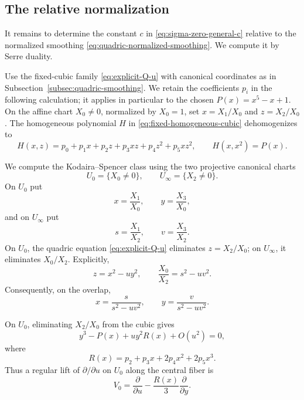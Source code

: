 \documentclass[10pt,a4paper]{amsart}
\begin{document}
\subsection{The relative normalization}
\label{subsec:relative-normalization}

It remains to determine the constant $c$ in
{\eqref{eq:sigma-zero-general-c}} relative to the normalized smoothing
\eqref{eq:quadric-normalized-smoothing}. We compute it by Serre duality.

\begingroup
Use the fixed-cubic family \eqref{eq:explicit-Q-u} with canonical
coordinates as in Subsection~\ref{subsec:quadric-smoothing}. We retain
the coefficients $p_i$ in the following calculation; it applies in
particular to the chosen $P(x)=x^5-x+1$. On the affine chart $X_0\neq0$, normalized by $X_0=1$, set
$x=X_1/X_0$ and $z=X_2/X_0$.
The homogeneous polynomial $H$ in
\eqref{eq:fixed-homogeneous-cubic} dehomogenizes to
\[
H(x,z)=p_0+p_1x+p_2z+p_3xz+p_4z^2+p_5xz^2,
\qquad H(x,x^2)=P(x).
\]
\endgroup


We compute the Kodaira--Spencer class using the two projective
canonical charts
\begin{equation*}
U_0=\{X_0\neq0\},
\qquad
U_\infty=\{X_2\neq0\}.
\end{equation*}
On $U_0$ put
\begin{equation*}
x=\frac{X_1}{X_0},
\qquad
y=\frac{X_3}{X_0},
\end{equation*}
and on $U_\infty$ put
\begin{equation*}
s=\frac{X_1}{X_2},
\qquad
v=\frac{X_3}{X_2}.
\end{equation*}
{On $U_0$, the quadric equation
\eqref{eq:explicit-Q-u} eliminates $z=X_2/X_0$;
on $U_\infty$, it eliminates $X_0/X_2$. Explicitly,}
\begingroup
\[
z=x^2-uy^2,
\qquad
\frac{X_0}{X_2}=s^2-uv^2.
\]
\endgroup
{Consequently, on the overlap,}
\begin{equation}
\label{eq:projective-transition-u}
x=\frac{s}{s^2-uv^2},
\qquad
y=\frac{v}{s^2-uv^2}.
\end{equation}

On $U_0$, eliminating $X_2/X_0$ from the cubic gives
\begin{equation*}
y^3-P(x)+uy^2R(x)+O(u^2)=0,
\end{equation*}
where
\begin{equation*}
R(x)=p_2+p_3x+2p_4x^2+2p_5x^3.
\end{equation*}
Thus a regular lift of $\partial/\partial u$ on $U_0$ {along the central fiber} is
\begin{equation}
\label{eq:lift-U0}
V_0
=
\frac{\partial}{\partial u}
-\frac{R(x)}{3}\frac{\partial}{\partial y}.
\end{equation}
\end{document}
